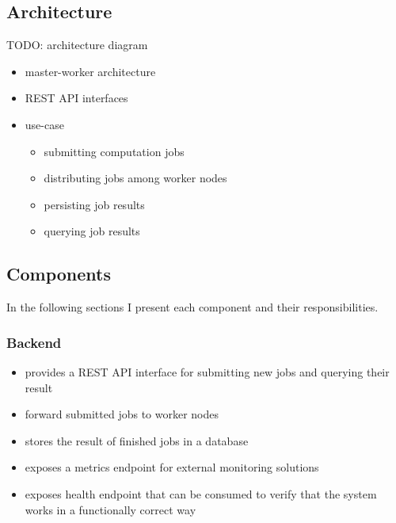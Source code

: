 \subsection{Architecture}

TODO: architecture diagram

\begin{itemize}
	\item master-worker architecture
	\item REST API interfaces
	\item use-case
	\begin{itemize}
		\item submitting computation jobs
		\item distributing jobs among worker nodes
		\item persisting job results
		\item querying job results
	\end{itemize}
	
\end{itemize}


\subsection{Components}

In the following sections I present each component and their responsibilities.

\subsubsection{Backend}

\begin{itemize}
	\item provides a REST API interface for submitting new jobs and querying their result
	\item forward submitted jobs to worker nodes
	\item stores the result of finished jobs in a database
	\item exposes a metrics endpoint for external monitoring solutions
	\item exposes health endpoint that can be consumed to verify that the system works in a functionally correct way
\end{itemize}

